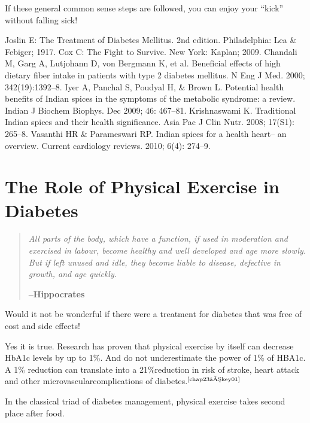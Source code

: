 If these general common sense steps are followed, you can enjoy your “kick” without falling sick!

\begin{thebibliography}{99}
 Joslin E: The Treatment of Diabetes Mellitus. 2nd edition. Phila\-delphia: Lea \& Febiger; 1917.
 Cox C: The Fight to Survive. New York: Kaplan; 2009.
 Chandali M, Garg A, Lutjohann D, von Bergmann K, et al. Beneficial effects of high dietary fiber intake in patients with type 2 diabetes mellitus. N Eng J Med. 2000; 342(19):1392–8.
 Iyer A, Panchal S, Poudyal H, \& Brown L. Potential health benefits of Indian spices in the symptoms of the metabolic syndrome: a review. Indian J Biochem Biophys. Dec 2009; 46: 467–81.
 Krishnaswami K. Traditional Indian spices and their health signi\-ficance. Asia Pac J Clin Nutr. 2008; 17(S1): 265–8.
 Vasanthi HR \& Parameswari RP. Indian spices for a health heart– an overview. Current cardiology reviews. 2010; 6(4): 274–9.
\end{thebibliography}


\chapter{The Role of Physical Exercise in Diabetes}\label{chap23}

\begin{quote}
\textit{All parts of the body, which have a function, if used in moderation and exercised in labour, become healthy and well developed and age more slowly. But if left unused and idle, they become liable to disease, defective in growth, and age quickly.}
\begin{flushright}
\textbf{–Hippocrates}
\end{flushright}
\end{quote}

Would it not be wonderful if there were a treatment for diabetes that was free of cost and side effects!

Yes it is true. Research has proven that physical exercise by it\-self can decrease HbA1c levels by up to 1\%. And do not underestimate the power of 1\% of HBA1c. A 1\% reduction can translate into a 21\%\break reduction in risk of stroke, heart attack and other microvascular\break complications of diabetes.$^{\text{\cite{chap23–key01}}}$

In the classical triad of diabetes management, physical exercise takes second place after food.

